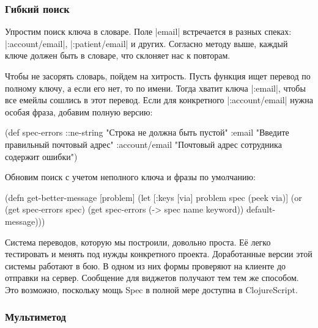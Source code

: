 \subsubsection{Гибкий поиск}


Упростим поиск ключа в словаре. Поле \spverb|email| встречается в разных спеках:
\spverb|:account/email|, \spverb|:patient/email| и других. Согласно методу выше,
каждый ключе должен быть в словаре, что склоняет нас к повторам.

Чтобы не засорять словарь, пойдем на хитрость. Пусть функция ищет перевод по
полному ключу, а если его нет, то по имени. Тогда хватит ключа \spverb|:email|,
чтобы все емейлы сошлись в этот перевод. Если для конкретного
\spverb|:account/email| нужна особая фраза, добавим полную версию:

  \begin{clojure}
(def spec-errors
  {::ne-string "Строка не должна быть пустой"
   :email "Введите правильный почтовый адрес"
   :account/email "Почтовый адрес сотрудника содержит ошибки"})
  \end{clojure}

\noindent
Обновим поиск с учетом неполного ключа и фразы по умолчанию:

\begin{english}
  \begin{clojure}
(defn get-better-message
  [problem]
  (let [{:keys [via]} problem
        spec (peek via)]
    (or (get spec-errors spec)
        (get spec-errors (-> spec name keyword))
        default-message)))
  \end{clojure}
\end{english}


Система переводов, которую мы построили, довольно проста. Е\"{е} легко тестировать и
менять под нужды конкретного проекта. Доработанные версии этой системы работают
в бою. В одном из них формы проверяют на клиенте до отправки на
сервер. Сообщение для виджетов получают тем тем же способом. Это возможно,
поскольку мощь Spec в полной мере доступна в ClojureScript.

\subsubsection{Мультиметод}


